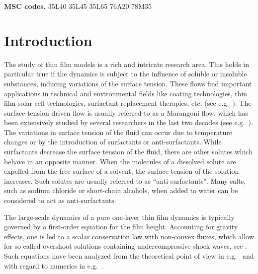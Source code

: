 \documentclass[11pt]{article}
\numberwithin{equation}{section}
\newtheorem{counter example}[theorem]{Counter Example}
\begin{document}
{\textbf{MSC codes.}  35L40 35L45 35L65 76A20  78M35

\section{Introduction}
The study of thin film models is a 
rich and intricate research area. This holds in particular true if the dynamics is subject to the influence of soluble or insoluble substances, inducing variations of the surface tension. These flows find important applications in technical and environmental fields like coating technologies, thin film solar cell technologies, surfactant replacement therapies, etc.  (see e.g.\ \cite{craster2009dynamics, Kutteretal, matar2004rupture, o2002theory}). The surface-tension driven flow is usually referred to as a Marangoni flow, which has been extensively studied by several researchers in the last two decades (see e.g.\ \cite{billingham2006surface, gaver1990dynamics, jensen1992insoluble,  keller1983surface,  matar2004rupture, myers1998thin}). The variations in surface tension of the fluid can occur due to temperature changes or by the introduction of surfactants or anti-surfactants. While surfactants decrease the surface tension of the fluid, there are other solutes which behave in an opposite manner. When the molecules of a dissolved solute are expelled from the free surface of a solvent, the surface tension of the solution increases. Such solutes are usually referred to as ``anti-surfactants". Many salts, such as sodium chloride or short-chain alcohols, when added to water can be considered to act as anti-surfactants.

The large-scale dynamics of a pure one-layer thin film dynamics is typically governed by a first-order equation for the film height. Accounting for gravity effects, one is led to a scalar conservation law with non-convex fluxes, which allow for so-called overshoot solutions containing undercompressive shock waves, see \cite{cook2008shock}. Such equations have been analyzed from the 
theoretical point of view in e.g.\  \cite{bertozzi1999undercompressive} and with regard to numerics in e.g.\ \cite{Chalonsetal}.

}
\end{document}

